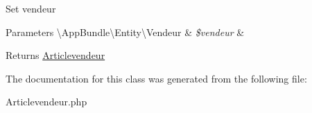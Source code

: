 Set vendeur


\begin{DoxyParams}[1]{Parameters}
\textbackslash{}\+App\+Bundle\textbackslash{}\+Entity\textbackslash{}\+Vendeur & {\em \$vendeur} & \\
\hline
\end{DoxyParams}
\begin{DoxyReturn}{Returns}
\hyperlink{class_app_bundle_1_1_entity_1_1_articlevendeur}{Articlevendeur} 
\end{DoxyReturn}


The documentation for this class was generated from the following file\+:\begin{DoxyCompactItemize}
\item 
Articlevendeur.\+php\end{DoxyCompactItemize}
